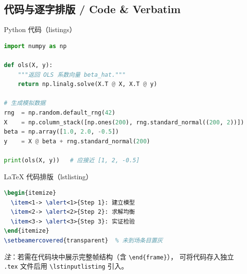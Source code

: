 \subsection{代码与逐字排版 / Code \& Verbatim}

\begin{frame}[fragile]{Python 代码（listings）}
  \begin{lstlisting}[language=Python, caption={OLS 估计量（NumPy 实现）}]
import numpy as np

def ols(X, y):
    """返回 OLS 系数向量 beta_hat."""
    return np.linalg.solve(X.T @ X, X.T @ y)

# 生成模拟数据
rng  = np.random.default_rng(42)
X    = np.column_stack([np.ones(200), rng.standard_normal((200, 2))])
beta = np.array([1.0, 2.0, -0.5])
y    = X @ beta + rng.standard_normal(200)

print(ols(X, y))   # 应接近 [1, 2, -0.5]
  \end{lstlisting}
\end{frame}

\begin{frame}[fragile]{LaTeX 代码排版（lstlisting）}
  \begin{lstlisting}[language=TeX, caption={帧内叠加动画（内部代码）}]
% 以下内容放在 frame 环境内部（外层为 \begin{frame}...\end{...} 结构）：
\begin{itemize}
  \item<1-> \alert<1>{Step 1}: 建立模型
  \item<2-> \alert<2>{Step 2}: 求解均衡
  \item<3-> \alert<3>{Step 3}: 实证检验
\end{itemize}
\setbeamercovered{transparent}  % 未到场条目置灰
  \end{lstlisting}
  {\footnotesize\textit{注}：若需在代码块中展示完整帧结构（含 \texttt{\textbackslash end\{frame\}}），
  可将代码存入独立 \texttt{.tex} 文件后用 \texttt{\textbackslash lstinputlisting} 引入。}
\end{frame}

